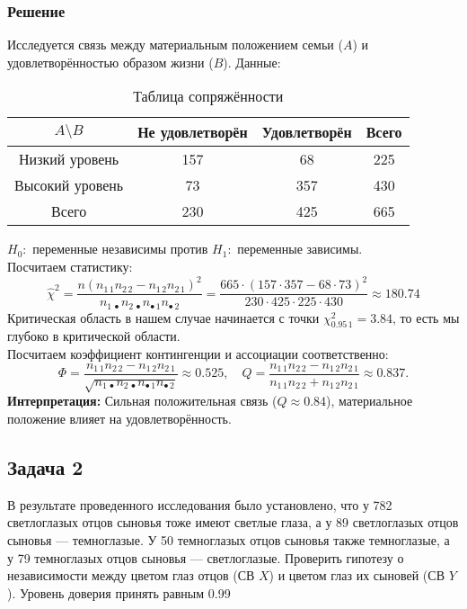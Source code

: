 \documentclass[12pt, a4paper]{article}
\begin{document}
\subsubsection*{Решение}
Исследуется связь между материальным положением семьи ($A$) и удовлетворённостью образом жизни ($B$). Данные:

\begin{table}[h!]
    \centering
    \caption{Таблица сопряжённости}
    \begin{tabular}{|c|c|c|c|}
    \hline
    $A\setminus B$ & Не удовлетворён & Удовлетворён & Всего \\ 
    \hline
    Низкий уровень & 157 & 68 & 225 \\ 
    \hline
    Высокий уровень & 73 & 357 & 430 \\ 
    \hline
    Всего & 230 & 425 & 665 \\ 
    \hline
    \end{tabular}
\end{table}
\noindent
$H_0:$ переменные независимы против $H_1:$ переменные зависимы.\\
Посчитаем статистику:
\[
\hat \chi^2 = \frac{n{(n_{1\, 1} n_{2\, 2} - n_{1\, 2} n_{2\, 1})}^2}{n_{1\, \bullet} n_{2\, \bullet} n_{\bullet\, 1} n_{\bullet\, 2}} = \frac{665\cdot {(157 \cdot 357 - 68\cdot 73)}^2}{230 \cdot 425 \cdot 225 \cdot 430} \approx 180.74
\]
Критическая область в нашем случае начинается с точки $\chi^2_{0.95\, 1} = 3.84$, то есть мы глубоко в критической области.\\
\noindent
Посчитаем коэффициент контингенции и ассоциации соответственно:
\[
\Phi = \frac{n_{1\, 1} n_{2\, 2} - n_{1\, 2} n_{2\, 1}}{\sqrt{n_{1\, \bullet} n_{2\, \bullet} n_{\bullet\, 1} n_{\bullet\, 2}}} \approx 0.525, \quad Q = \frac{n_{1\, 1} n_{2\, 2} - n_{1\, 2} n_{2\, 1}}{n_{1\, 1} n_{2\, 2} + n_{1\, 2} n_{2\, 1}} \approx 0.837.
\]
\noindent
\textbf{Интерпретация:} Сильная положительная связь ($Q \approx 0.84$), материальное положение влияет на удовлетворённость.
\subsection*{Задача 2}
В результате проведенного исследования было установлено,
что у 782 светлоглазых отцов сыновья тоже имеют светлые глаза,
а у 89 светлоглазых отцов сыновья — темноглазые. У 50 темноглазых отцов сыновья также темноглазые, а у 79 темноглазых отцов
сыновья — светлоглазые. Проверить гипотезу о независимости между
цветом глаз отцов (СВ $X$) и цветом глаз их сыновей (СВ $Y$). Уровень
доверия принять равным 0.99
\end{document}
